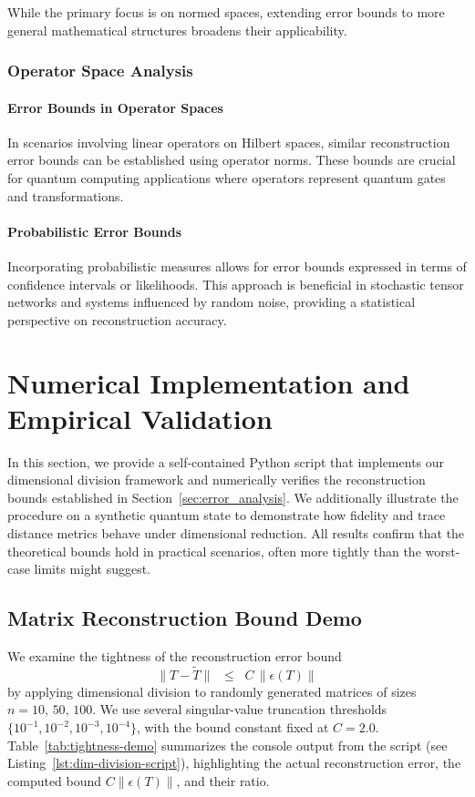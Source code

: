 \documentclass[sn-mathphys-num]{sn-jnl}
\theoremstyle{thmstyleone}
\theoremstyle{thmstyletwo}
\theoremstyle{thmstylethree}
\begin{document}
While the primary focus is on normed spaces, extending error bounds to more general mathematical structures broadens their applicability.

\subsubsection{Operator Space Analysis}
\paragraph{Error Bounds in Operator Spaces}
In scenarios involving linear operators on Hilbert spaces, similar reconstruction error bounds can be established using operator norms. These bounds are crucial for quantum computing applications where operators represent quantum gates and transformations.

\paragraph{Probabilistic Error Bounds}
Incorporating probabilistic measures allows for error bounds expressed in terms of confidence intervals or likelihoods. This approach is beneficial in stochastic tensor networks and systems influenced by random noise, providing a statistical perspective on reconstruction accuracy.

\section{Numerical Implementation and Empirical Validation}
\label{sec:numerical-validation}

In this section, we provide a self-contained Python script that implements our dimensional division framework and numerically verifies the reconstruction bounds established in Section~\ref{sec:error_analysis}. We additionally illustrate the procedure on a synthetic quantum state to demonstrate how fidelity and trace distance metrics behave under dimensional reduction. All results confirm that the theoretical bounds hold in practical scenarios, often more tightly than the worst-case limits might suggest.

\subsection{Matrix Reconstruction Bound Demo}

We examine the tightness of the reconstruction error bound 
\[
\lVert T - \tilde{T} \rVert \;\;\le\;\; C\,\lVert\epsilon(T)\rVert
\]
by applying dimensional division to randomly generated matrices of sizes $n=10,\,50,\,100$. We use several singular-value truncation thresholds $\{10^{-1}, 10^{-2}, 10^{-3}, 10^{-4}\}$, with the bound constant fixed at $C=2.0$. Table~\ref{tab:tightness-demo} summarizes the console output from the script (see Listing~\ref{lst:dim-division-script}), highlighting the actual reconstruction error, the computed bound $C\lVert\epsilon(T)\rVert$, and their ratio.
\end{document}
